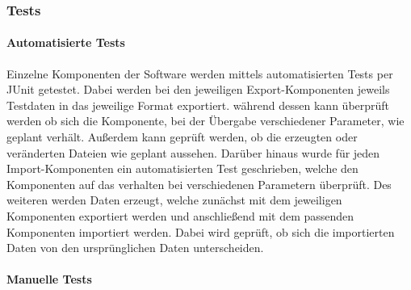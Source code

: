 \subsubsection{Tests}
\paragraph{Automatisierte Tests}
Einzelne Komponenten der Software werden mittels automatisierten Tests per JUnit getestet. Dabei werden bei den jeweiligen Export-Komponenten jeweils Testdaten in das jeweilige Format exportiert. während dessen kann überprüft werden ob sich die Komponente, bei der Übergabe verschiedener Parameter, wie geplant verhält. Außerdem kann geprüft werden, ob die erzeugten oder veränderten Dateien wie geplant aussehen. Darüber hinaus wurde für jeden Import-Komponenten ein automatisierten Test geschrieben, welche den Komponenten auf das verhalten bei verschiedenen Parametern überprüft. Des weiteren werden Daten erzeugt, welche zunächst mit dem jeweiligen Komponenten exportiert werden und anschließend mit dem passenden Komponenten importiert werden. Dabei wird geprüft, ob sich die importierten Daten von den ursprünglichen Daten unterscheiden.

\paragraph{Manuelle Tests}
